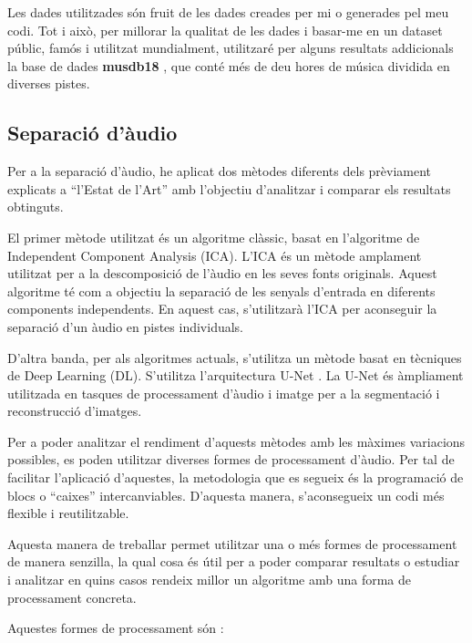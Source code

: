 \documentclass[10pt,a4paper,twocolumn,twoside]{article}
\begin{document}
Les dades utilitzades són fruit de les dades creades per mi o generades pel meu codi. Tot i això, per millorar la qualitat de les dades i basar-me en un dataset públic, famós i utilitzat mundialment, utilitzaré per alguns resultats addicionals la base de dades \textbf{musdb18} \cite{musdb18}, que conté més de deu hores de música dividida en diverses pistes.



\subsection{Separació d'àudio}

Per a la separació d'àudio, he aplicat dos mètodes diferents dels prèviament explicats a ``l'Estat de l'Art'' amb l'objectiu d'analitzar i comparar els resultats obtinguts.

El primer mètode utilitzat és un algoritme clàssic, basat en l'algoritme de Independent Component Analysis (ICA). L'ICA és un mètode amplament utilitzat per a la descomposició de l'àudio en les seves fonts originals. Aquest algoritme té com a objectiu la separació de les senyals d'entrada en diferents components independents. En aquest cas, s'utilitzarà l'ICA per aconseguir la separació d'un àudio en pistes individuals.

D'altra banda, per als algoritmes actuals, s'utilitza un mètode basat en tècniques de Deep Learning (DL). S'utilitza l'arquitectura U-Net \cite{spleeter2020}. La U-Net és àmpliament utilitzada en tasques de processament d'àudio i imatge per a la segmentació i reconstrucció d'imatges.

Per a poder analitzar el rendiment d'aquests mètodes amb les màximes variacions possibles, es poden utilitzar diverses formes de processament d'àudio. Per tal de facilitar l'aplicació d'aquestes, la metodologia que es segueix és la programació de blocs o ``caixes'' intercanviables. D'aquesta manera, s'aconsegueix un codi més flexible i reutilitzable.

Aquesta manera de treballar permet utilitzar una o més formes de processament de manera senzilla, la qual cosa és útil per a poder comparar resultats o estudiar i analitzar en quins casos rendeix millor un algoritme amb una forma de processament concreta.

Aquestes formes de processament són \cite{audio-processing-ML}:
\end{document}
